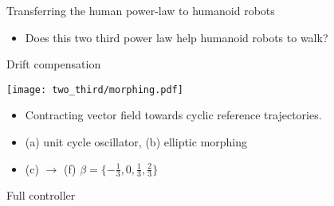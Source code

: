 \begin{frame}{Transferring the human power-law to humanoid robots}
\begin{itemize}
{
}
    \item Does this two third power law help humanoid robots to walk?
  \end{itemize}
\end{frame}

\begin{frame}{Drift compensation}
\vspace*{-0.8cm}  
  \begin{center}
    \texttt{[image: two\_third/morphing.pdf]}
  \end{center}
  \vspace*{-0.5cm}
  \begin{itemize}
    \item Contracting vector field towards cyclic reference trajectories.
    \item (a) unit cycle oscillator, (b) elliptic morphing
    \item (c) $\rightarrow$ (f) $\beta=\{-\frac{1}{3},0,\frac{1}{3},\frac{2}{3}\}$
  \end{itemize}
\end{frame}

\begin{frame}{Full controller}
  \begin{center}
    \scalebox{0.7}{} \\
  \end{center}
\end{frame}

